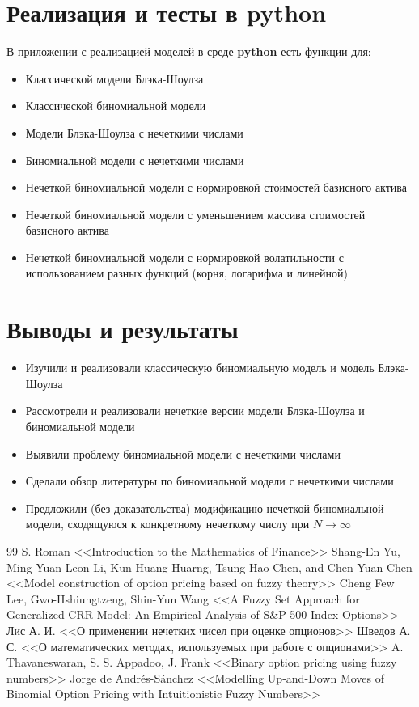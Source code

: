 \documentclass[a4paper, 12pt]{extarticle}
\begin{document}
	\section{Реализация и тесты в python}
	В \href{https://github.com/alexveider1/Option_pricing_models/blob/main/%D0%9E%D1%86%D0%B5%D0%BD%D0%BA%D0%B0%20%D1%81%D1%82%D0%BE%D0%B8%D0%BC%D0%BE%D1%81%D1%82%D0%B8%20%D0%BE%D0%BF%D1%86%D0%B8%D0%BE%D0%BD%D0%BE%D0%B2.ipynb}{приложении} с реализацией моделей в среде \textbf{python} есть функции для: 
	\begin{itemize}
	\item Классической модели Блэка-Шоулза
	\item Классической биномиальной модели
	\item Модели Блэка-Шоулза с нечеткими числами
	\item Биномиальной модели с нечеткими числами
	\item Нечеткой биномиальной модели с нормировкой стоимостей базисного актива
	\item Нечеткой биномиальной модели с уменьшением массива стоимостей базисного актива
	\item Нечеткой биномиальной модели с нормировкой волатильности с использованием разных функций (корня, логарифма и линейной)
	\end{itemize}
	
	\section{Выводы и результаты}
	\begin{itemize}
		\item Изучили и реализовали классическую биномиальную модель и модель Блэка-Шоулза
		\item Рассмотрели и реализовали нечеткие версии модели Блэка-Шоулза и биномиальной модели
		\item Выявили проблему биномиальной модели с нечеткими числами
		\item Сделали обзор литературы по биномиальной модели с нечеткими числами
		\item Предложили (без доказательства) модификацию нечеткой биномиальной модели, сходящуюся к конкретному нечеткому числу при $N \to \infty$
	\end{itemize}
	\newpage{}
	
	\begin{thebibliography}{99}
		 S. Roman <<Introduction to the Mathematics of Finance>>
		 Shang-En Yu, Ming-Yuan Leon Li, Kun-Huang Huarng, Tsung-Hao Chen, and Chen-Yuan Chen <<Model construction of option pricing based on fuzzy theory>>
		 Cheng Few Lee, Gwo-Hshiungtzeng, Shin-Yun Wang <<A Fuzzy Set Approach for Generalized CRR Model: An Empirical Analysis of S\&P 500 Index Options>>
		 Лис А. И. <<О применении нечетких чисел при оценке опционов>>
		 Шведов А. С. <<О математических методах, используемых при работе с опционами>>
		 A. Thavaneswaran, S. S. Appadoo, J. Frank <<Binary option pricing using fuzzy numbers>>
		 Jorge de Andrés-Sánchez <<Modelling Up-and-Down Moves of Binomial Option Pricing with Intuitionistic Fuzzy Numbers>>
	\end{thebibliography}
	\newpage{}
	
	\tableofcontents{}
	
\end{document}
